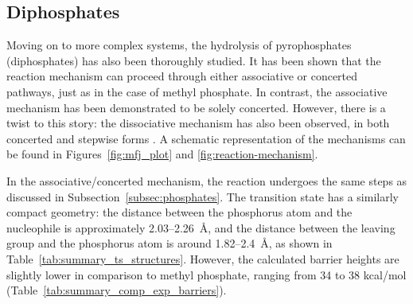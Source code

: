 \subsection{Diphosphates}
Moving on to more complex systems, the hydrolysis of pyrophosphates (diphosphates) has also been thoroughly studied. It has been shown that the reaction mechanism can proceed through either associative or concerted pathways, just as in the case of methyl phosphate. In contrast, the associative mechanism has been demonstrated to be solely concerted. However, there is a twist to this story: the dissociative mechanism has also been observed, in both concerted and stepwise forms \citep{klahnMechanismHydrolysisPhosphate2006, kamerlinAssociativeDissociativeMechanisms2008, prasadAddressingOpenQuestions2013}. A schematic representation of the mechanisms can be found in Figures~\ref{fig:mfj_plot} and \ref{fig:reaction-mechanism}.

In the associative/concerted mechanism, the reaction undergoes the same steps as discussed in Subsection~\ref{subsec:phosphates}. The transition state has a similarly compact geometry: the distance between the phosphorus atom and the nucleophile is approximately 2.03--2.26~\AA, and the distance between the leaving group and the phosphorus atom is around 1.82--2.4~\AA, as shown in Table~\ref{tab:summary_ts_structures}. However, the calculated barrier heights are slightly lower in comparison to methyl phosphate, ranging from 34 to 38 kcal/mol (Table~\ref{tab:summary_comp_exp_barriers}).

